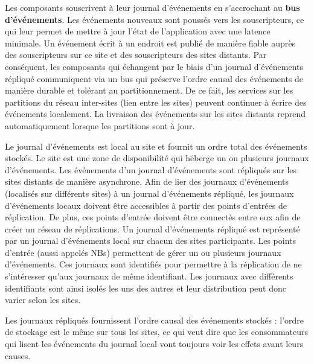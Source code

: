 Les composants souscrivent à leur journal d'événements en s'accrochant au 
\textbf{bus d'événements}.
Les événements nouveaux sont poussés vers les souscripteurs, 
ce qui leur permet de mettre à jour l'état de l'application avec une latence 
minimale. 
Un événement écrit à un endroit est publié de manière fiable auprès des souscripteurs sur 
ce site et des souscripteurs des sites distants. 
Par conséquent, les composants qui échangent par le biais d'un 
journal d'événements répliqué communiquent via un bus qui préserve l'ordre causal 
des événements de manière durable et tolérant au partitionnement. De ce fait, les 
services sur les partitions du réseau inter-sites (lien entre les sites) peuvent 
continuer à écrire des événements localement. La livraison des événements sur 
les sites distants reprend automatiquement lorsque les partitions sont à jour.


Le journal d'événements est local au site et fournit un ordre total des 
événements stockés. 
Le site est une zone de disponibilité qui héberge un ou plusieurs 
journaux d'événements. Les événements d'un journal d'événements sont 
répliqués sur les sites distants de manière asynchrone. 
Afin de lier des journaux d'événements (localisés sur différents sites) à un journal 
d'événements répliqué, les 
journaux d'événements locaux doivent être accessibles à partir des points 
d'entrées de réplication. De plus, ces points d'entrée doivent être 
connectés entre eux afin de créer un réseau de réplications. 
Un journal d'événements répliqué est représenté par un journal d'événements local 
sur chacun des sites participants.
Les points d'entrée (aussi appelés \glspl{NB})
permettent de gérer un ou plusieurs journaux d'événements. 
Ces journaux sont identifiés pour permettre à la réplication de ne s'intéresser 
qu'aux journaux de même identifiant. 
Les journaux avec différents identifiants sont ainsi isolés les uns des autres et 
leur distribution peut donc varier selon les sites.

Les journaux répliqués fournissent l'ordre causal des événements stockés : l'ordre 
de stockage est le même sur tous les sites, ce qui veut dire que les 
consommateurs qui lisent les événements du journal local vont toujours voir les 
effets avant leurs causes.
